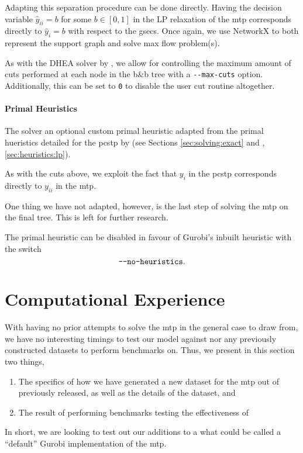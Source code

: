 Adapting this separation procedure can be done directly. Having the decision variable
$\hat y_{ii} = b$ for some $b \in [0,1]$ in the LP relaxation of
the \gls{mtp} corresponds directly to $\hat y_i = b$ with respect to the \glspl{gsec}.
Once again, we use NetworkX to both represent the support graph and solve max flow problem(s).

As with the DHEA solver by \citet{ljubic2005solving}, we allow for controlling the maximum amount
of cuts performed at each node in the b\&b tree
with a \texttt{-{}-max-cuts} option. Additionally, this can be set
to \texttt{0} to disable the user cut routine altogether.

\paragraph{Primal Heuristics}
The solver an optional custom primal heuristic adapted from the primal hueristics detailed
for the \gls{pcstp} by \citet{ljubic2005solving}
(see Sections \ref{sec:solving:exact} and , \ref{sec:heuristics:lp}).

As with the cuts above, we exploit the fact that $y_i$ in the \gls{pcstp}
corresponds directly to $y_{ii}$ in the \gls{mtp}.

One thing we have not adapted, however, is the last step of solving the \gls{mtp}
on the final tree. This is left for further research.

The primal heuristic can be disabled in favour of Gurobi's inbuilt heuristic with
the switch $$\texttt{-{}-no-heuristics}\mathnormal{.}$$
\section{Computational Experience}
With having no prior attempts to solve the \gls{mtp} in the general case to draw from,
we have no interesting timings to test our model against nor any previously constructed
datasets to perform benchmarks on. Thus, we present in this section two things,
\begin{enumerate}
\item The specifics of how we have generated a new dataset for the \gls{mtp} out of previously released,
  as well as the details of the dataset, and
\item The result of performing benchmarks testing the effectiveness of
\end{enumerate}
In short, we are looking to test out our additions to a what could be called a ``default'' Gurobi
implementation of the \gls{mtp}.

